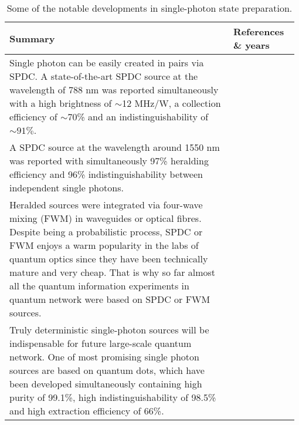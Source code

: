 \begin{table*}[!htbp]
	\begin{tabular}{|p{0.755\linewidth}|p{0.22\linewidth}|}
		\hline
		Summary & References \& years \\
		\hline \hline
		Single photon can be easily created in pairs via SPDC. A state-of-the-art SPDC source at the wavelength of 788 nm was reported simultaneously with a high brightness of $\sim$12 MHz/W, a collection efficiency of $\sim$70\% and an indistinguishability of $\sim 91\%$. & \cite{bib:wang2016experimental} \\
		\hline
		A SPDC source at the wavelength around 1550 nm was reported with simultaneously 97\% heralding efficiency and 96\% indistinguishability between independent single photons. & \cite{bib:zhong201812} \\
		\hline
		Heralded sources were integrated via four-wave mixing (FWM) in waveguides or optical fibres. Despite being a probabilistic process, SPDC or FWM enjoys a warm popularity in the labs of quantum optics since they have been technically mature and very cheap. That is why so far almost all the quantum information experiments in quantum network were based on SPDC or FWM sources. & \cite{bib:silverstone2014, bib:spring2017chip, bib:goldschmidt2008, bib:smith2009} \\
		\hline
		Truly deterministic single-photon sources will be indispensable for future large-scale quantum network. One of most promising single photon sources are based on quantum dots, which have been developed simultaneously containing high purity of 99.1\%, high indistinguishability of 98.5\% and high extraction efficiency of 66\%. & \cite{bib:he2013on, bib:wei2014de, bib:ding2016on, bib:somaschi2016, bib:wang2016near, bib:loredo2016} \\
		\hline
	\end{tabular}
	\captionspacetab \caption{Some of the notable developments in single-photon state preparation.} \label{tab:single_photon_state}
\end{table*}

